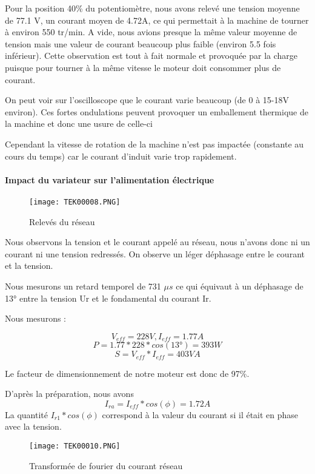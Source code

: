 \documentclass[oneside,a4paper,12pt]{article}
\begin{document}
	Pour la position 40\% du potentiomètre, nous avons relevé une tension moyenne de 77.1 V, un courant moyen de 4.72A, ce qui permettait à la machine de tourner à environ 550 tr/min. 
	A vide, nous avions presque la même valeur moyenne de tension mais une valeur de courant beaucoup plus faible (environ 5.5 fois inférieur). Cette observation est tout à fait normale et provoquée par la charge puisque pour tourner à la même vitesse le moteur doit consommer plus de courant.

	On peut voir sur l’oscilloscope que le courant varie beaucoup (de 0 à 15-18V environ). Ces fortes ondulations peuvent provoquer un emballement thermique de la machine et donc une usure de celle-ci

	Cependant la vitesse de rotation de la machine n’est pas impactée (constante au cours du temps) car le courant d’induit varie trop rapidement.
	
	\paragraph{Impact du variateur sur l'alimentation électrique}
	
	\begin{figure}[h]
		\centering
		\texttt{[image: TEK00008.PNG]}
		\caption{Relevés du réseau}
	\end{figure}

	Nous observons la tension et le courant appelé au réseau, nous n'avons donc ni un courant ni une tension redressés. On observe un léger déphasage entre le courant et la tension.

	Nous mesurons un retard temporel de 731 $\mu s$ ce qui équivaut à un déphasage de 13° entre la tension Ur et le fondamental du courant Ir.

	Nous mesurons :

	$$ V_{eff}=228V, I_{eff}=1.77A $$
	$$ P=1.77*228*cos(13°)=393W $$
	$$ S=V_{eff}*I_{eff}=403VA $$
	
	Le facteur de dimensionnement de notre moteur est donc de 97\%.
	
	D’après la préparation, nous avons $$I_{ra}= I_{eff}*cos(\phi)=1.72 A$$
	La quantité $I_{r1}*cos(\phi)$ correspond à la valeur du courant si il était en phase avec la tension.
	
	\begin{figure}[h]
		\centering
		\texttt{[image: TEK00010.PNG]}
		\caption{Transformée de fourier du courant réseau}
	\end{figure}
\end{document}
